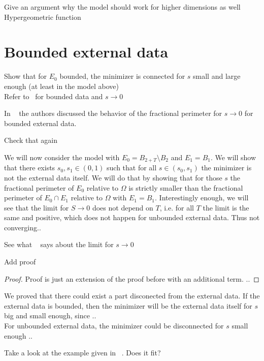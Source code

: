 \begin{TODO}
	Give an argument why the model should work for higher dimensions as well\\
	Hypergeometric function
\end{TODO}


\section{Bounded external data}
\label{sec:bounded_external_data}

\begin{TODO}
	Show that for \( E_0 \) bounded, the minimizer is connected for \( s \) small and
	large enough (at least in the model above)\\
	Refer to~\cite{dipierro2012asymptotics} for bounded data and \( s \to 0 \)
\end{TODO}

In ~\cite{dipierro2012asymptotics} the authors discussed the behavior of the fractional
perimeter for \( s \to 0 \) for bounded external data.
\begin{TODO}
	Check that again
\end{TODO}

We will now consider the model with \( E_0 = B_{2 + T} \setminus B_2 \) and \( E_1 = B_1
\). We will show that there exists \( s_0, s_1 \in (0, 1) \) such that for all \( s \in
(s_0, s_1) \) the minimizer is not the external data itself. We will do that by showing
that for those \( s \) the fractional perimeter of \( E_0 \) relative to \( \Omega \) is
strictly smaller than the fractional perimeter of \( E_0 \cap E_1 \) relative to \( \Omega
\) with \( E_1 = B_1 \). Interestingly enough, we will see that the limit for \( S \to 0
\) does not depend on \( T \), i.e. for all \( T \) the limit is the same and positive,
which does not happen for unbounded external data. Thus not converging..
\begin{TODO}
	See what ~\cite{dipierro2012asymptotics} says about the limit for \( s \to 0 \)
\end{TODO}


\begin{TODO}
	Add proof
\end{TODO}
\begin{proof}
	Proof is just an extension of the proof before with an additional term.
	..
\end{proof}

We proved that there could exist a part disconected from the external data. If the
external data is bounded, then the minimizer will be the external data itself for \( s \)
big and small enough, since .. \\
For unbounded external data, the minimizer could be disconnected for \( s \) small enough
..
\begin{TODO}
	Take a look at the example given in ~\cite{dipierro2012asymptotics}. Does it fit?
\end{TODO}

